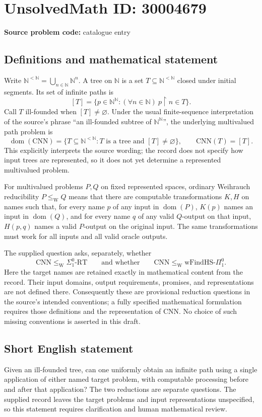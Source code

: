 \documentclass[11pt]{article}
\newcommand{\N}{\mathbb{N}}
\begin{document}
\section*{UnsolvedMath ID: 30004679}
\textbf{Source problem code:} catalogue entry
\subsection{Definitions and mathematical statement}
Write \(\N^{<\N}=\bigcup_{n\in\N}\N^n\). A tree on \(\N\) is a set \(T\subseteq\N^{<\N}\) closed under initial segments. Its set of infinite paths is
\[
[T]=\{p\in\N^{\N}: (\forall n\in\N)\ p\mathbin{\upharpoonright}n\in T\}.
\]
Call \(T\) ill-founded when \([T]\ne\varnothing\). Under the usual finite-sequence interpretation of the source's phrase ``an ill-founded subtree of \(\N^{\N}\)'', the underlying multivalued path problem is
\[
\operatorname{dom}(\mathrm{CNN})=\{T\subseteq\N^{<\N}:T\text{ is a tree and }[T]\ne\varnothing\},
\qquad \mathrm{CNN}(T)=[T].
\]
This explicitly interprets the source wording; the record does not specify how input trees are represented, so it does not yet determine a represented multivalued problem.

For multivalued problems \(P,Q\) on fixed represented spaces, ordinary Weihrauch reducibility \(P\leq_{\mathrm W}Q\) means that there are computable transformations \(K,H\) on names such that, for every name \(p\) of any input in \(\operatorname{dom}(P)\), \(K(p)\) names an input in \(\operatorname{dom}(Q)\), and for every name \(q\) of any valid \(Q\)-output on that input, \(H(p,q)\) names a valid \(P\)-output on the original input. The same transformations must work for all inputs and all valid oracle outputs.

The supplied question asks, separately, whether
\[
\mathrm{CNN}\leq_{\mathrm W}\Sigma^0_1\text{-}\mathrm{RT}
\qquad\text{and whether}\qquad
\mathrm{CNN}\leq_{\mathrm W}\mathrm{wFindHS}\text{-}\Pi^0_1.
\]
Here the target names are retained exactly in mathematical content from the record. Their input domains, output requirements, promises, and representations are not defined there. Consequently these are provisional reduction questions in the source's intended conventions; a fully specified mathematical formulation requires those definitions and the representation of \(\mathrm{CNN}\). No choice of such missing conventions is asserted in this draft.
\subsection{Short English statement}
Given an ill-founded tree, can one uniformly obtain an infinite path using a single application of either named target problem, with computable processing before and after that application? The two reductions are separate questions. The supplied record leaves the target problems and input representations unspecified, so this statement requires clarification and human mathematical review.
\end{document}
